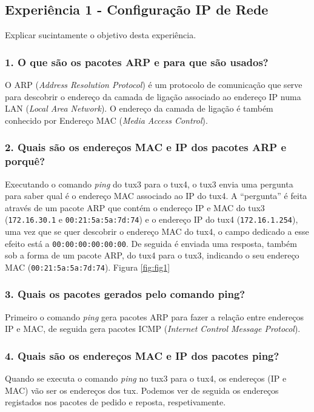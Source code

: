 \subsection*{Experiência 1 - Configuração IP de Rede}
Explicar sucintamente o objetivo desta experiência.

\subsubsection{1. O que são os pacotes ARP e para que são usados?}
O ARP (\emph{Address Resolution Protocol}) é um protocolo de comunicação que serve para descobrir o endereço da camada de ligação associado ao endereço IP numa LAN (\emph{Local Area Network}). O endereço da camada de ligação é também conhecido por Endereço MAC (\emph{Media Access Control}).

\subsubsection{2. Quais são os endereços MAC e IP dos pacotes ARP e porquê?}
Executando o comando \emph{ping} do tux3 para o tux4, o tux3 envia uma pergunta para saber qual é o endereço MAC associado ao IP do tux4. A \enquote{pergunta} é feita através de um pacote ARP que contém o endereço IP e MAC do tux3 (\verb+172.16.30.1+ e \verb+00:21:5a:5a:7d:74+) e o endereço IP do tux4 (\verb+172.16.1.254+), uma vez que se quer descobrir o endereço MAC do tux4, o campo dedicado a esse efeito está a \verb+00:00:00:00:00:00+. De seguida é enviada uma resposta, também sob a forma de um pacote ARP, do tux4 para o tux3, indicando o seu endereço MAC (\verb+00:21:5a:5a:7d:74+). Figura \ref{fig:fig1}

\subsubsection{3. Quais os pacotes gerados pelo comando ping?}
Primeiro o comando \emph{ping} gera pacotes ARP para fazer a relação entre endereços IP e MAC, de seguida gera pacotes ICMP (\emph{Internet Control Message Protocol}).

\subsubsection{4. Quais são os endereços MAC e IP dos pacotes ping?}
Quando se executa o comando \emph{ping} no tux3 para o tux4, os endereços (IP e MAC) vão ser os endereços dos tux. Podemos ver de seguida os endereços registados nos pacotes de pedido e reposta, respetivamente.

